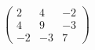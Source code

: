 \documentclass[preview]{standalone}
\begin{document}
\begin{align*}
\begin{pmatrix} 2 & 4 & -2 \\ 4 & 9 & -3 \\ -2 & -3 & 7 \end{pmatrix}
\end{align*}
\end{document}
